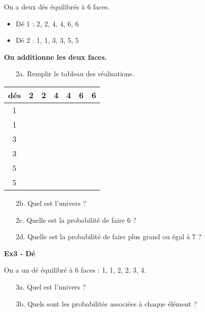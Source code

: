\begin{multicols}{2}\noindent
On a deux dés équilibrés à 6 faces. 

\begin{itemize}[label={$\bullet$}]
  \item Dé 1 : 2, 2, 4, 4, 6, 6
  \item Dé 2 : 1, 1, 3, 3, 5, 5 
\end{itemize} 

\textbf{On additionne les deux faces.} 
\begin{enumerate}
  \item[2a.] Remplir le tableau des réalisations.
\end{enumerate}  
\columnbreak 

\begin{center}\begin{tabular}{|c|c|c|c|c|c|c|} \hline
  dés & 2 & 2 & 4 & 4 & 6 & 6 \\  \hline
    1 &   &   &   &   &   &   \\  \hline
    1 &   &   &   &   &   &   \\  \hline
    3 &   &   &   &   &   &   \\  \hline
    3 &   &   &   &   &   &   \\  \hline
    5 &   &   &   &   &   &   \\  \hline
    5 &   &   &   &   &   &   \\  \hline
\end{tabular}\end{center}

\end{multicols}

\begin{enumerate}
  \item[2b.] Quel est l'univers ? \\ \Pointilles[2] 
  \item[2c.] Quelle est la probabilité de faire 6 ? \\ \Pointilles[2] 
  \item[2d.] Quelle est la probabilité de faire plus grand ou égal à 7 ? \\ \Pointilles[3]  
\end{enumerate}  

\textbf{Ex3 - Dé}

On a un dé équilibré à 6 faces : 1, 1, 2, 2, 3, 4.

\begin{enumerate}
  \item[3a.] Quel est l'univers ? \\ \Pointilles[2]
  \item[3b.] Quels sont les probabilités associées à chaque élément ? \\ \Pointilles[3]
\end{enumerate}  

